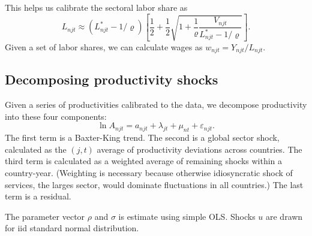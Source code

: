 \documentclass[12pt]{article}
\begin{document}
This helps us calibrate the sectoral labor share as
\[
L_{njt} \approx (L_{njt}^* - 1/\varrho) \left[
\frac12
+\frac12 \sqrt{1 + \frac1\varrho \frac{V_{njt}}{L_{njt}^* - 1/\varrho}}
\right].
\]
Given a set of labor shares, we can calculate wages as $w_{njt} = Y_{njt}/L_{njt}$.

\subsection{Decomposing productivity shocks}
Given a series of productivities calibrated to the data, we decompose productivity into these four components:
\begin{equation}
	\ln A_{njt} = a_{njt}+\lambda_{jt} + \mu_{nt} +  \varepsilon_{njt}.
\end{equation}
The first term is a Baxter-King trend. The second is a global sector shock, calculated as the $(j,t)$ average of productivity deviations across countries. The third term is calculated as a weighted average of remaining shocks within a country-year. (Weighting is necessary because otherwise idiosyncratic shock of services, the larges sector, would dominate fluctuations in all countries.) The last term is a residual.

The parameter vector $\rho$ and $\sigma$ is estimate using simple OLS. Shocks $u$ are drawn for iid standard normal distribution.
\end{document}
